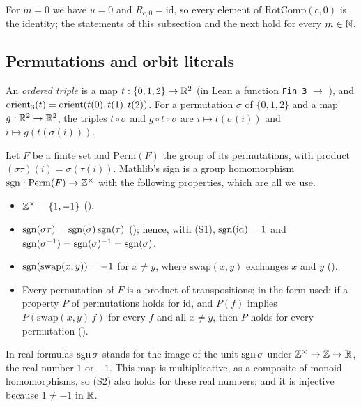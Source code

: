 For $m=0$ we have $u=0$ and $R_{c,0}=\mathrm{id}$, so every element of $\mathrm{RotComp}(c,0)$ is the
identity; the statements of this subsection and the next hold for every $m\in\mathbb N$.

\subsection{Permutations and orbit literals}\label{oc:sub:perm}

\begin{definition}\label{oc:def:orient3}
An \emph{ordered triple} is a map $t:\{0,1,2\}\to\mathbb R^2$ (in Lean a function \texttt{Fin 3} $\to$
), and $\operatorname{orient}_3(t)=\operatorname{orient}(t(0),t(1),t(2))$. For a permutation $\sigma$ of $\{0,1,2\}$ and a
map $g:\mathbb R^2\to\mathbb R^2$, the triples $t\circ\sigma$ and $g\circ t\circ\sigma$ are $i\mapsto t(\sigma(i))$ and
$i\mapsto g(t(\sigma(i)))$.
\end{definition}

\begin{fact}\label{oc:fact:sign}
Let $F$ be a finite set and $\mathrm{Perm}(F)$ the group of its permutations, with product
$(\sigma\tau)(i)=\sigma(\tau(i))$. Mathlib's sign is a group homomorphism
$\operatorname{sgn}:\mathrm{Perm}(F)\to\mathbb Z^\times$ with the following properties, which are all we use.
\begin{itemize}
\item[(S1)] $\mathbb Z^\times=\{1,-1\}$ ().
\item[(S2)] $\operatorname{sgn}(\sigma\tau)=\operatorname{sgn}(\sigma)\operatorname{sgn}(\tau)$ (); hence, with (S1),
  $\operatorname{sgn}(\mathrm{id})=1$ and $\operatorname{sgn}(\sigma^{-1})=\operatorname{sgn}(\sigma)^{-1}=\operatorname{sgn}(\sigma)$.
\item[(S3)] $\operatorname{sgn}(\mathrm{swap}(x,y))=-1$ for $x\ne y$, where $\mathrm{swap}(x,y)$ exchanges $x$ and $y$
  ().
\item[(S4)] Every permutation of $F$ is a product of transpositions; in the form used: if a property $P$
  of permutations holds for $\mathrm{id}$, and $P(f)$ implies $P(\mathrm{swap}(x,y)\,f)$ for every $f$ and
  all $x\ne y$, then $P$ holds for every permutation ().
\end{itemize}
In real formulas $\operatorname{sgn}\sigma$ stands for the image of the unit $\operatorname{sgn}\sigma$ under $\mathbb Z^\times\to\mathbb Z\to\mathbb R$,
the real number $1$ or $-1$. This map is multiplicative, as a composite of monoid homomorphisms, so
(S2) also holds for these real numbers; and it is injective because $1\ne-1$ in $\mathbb R$.
\end{fact}

